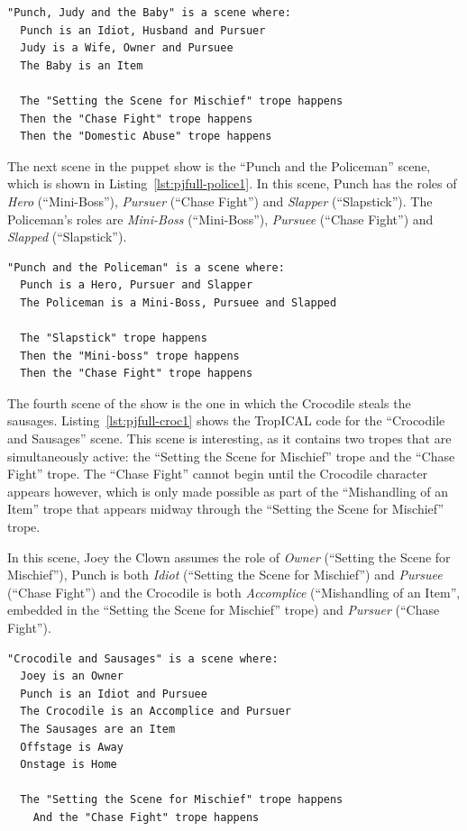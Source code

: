 \documentclass[11pt]{report}
\begin{document}
\begin{lstlisting}[showstringspaces=false,
label=lst:pjfull-baby1,caption={The ``Punch, Judy and the Baby'' scene in TropICAL}]
"Punch, Judy and the Baby" is a scene where:
  Punch is an Idiot, Husband and Pursuer
  Judy is a Wife, Owner and Pursuee
  The Baby is an Item

  The "Setting the Scene for Mischief" trope happens
  Then the "Chase Fight" trope happens
  Then the "Domestic Abuse" trope happens
\end{lstlisting}

The next scene in the puppet show is the ``Punch and the Policeman'' scene,
which is shown in Listing~\ref{lst:pjfull-police1}. In this scene, Punch has the
roles of \emph{Hero} (``Mini-Boss''), \emph{Pursuer} (``Chase Fight'') and
\emph{Slapper} (``Slapstick''). The Policeman's roles are \emph{Mini-Boss}
(``Mini-Boss''), \emph{Pursuee} (``Chase Fight'') and \emph{Slapped} (``Slapstick'').

\begin{lstlisting}[showstringspaces=false,
label=lst:pjfull-police1,caption={The ``Punch and the Policeman'' scene in TropICAL}]
"Punch and the Policeman" is a scene where:
  Punch is a Hero, Pursuer and Slapper
  The Policeman is a Mini-Boss, Pursuee and Slapped

  The "Slapstick" trope happens
  Then the "Mini-boss" trope happens
  Then the "Chase Fight" trope happens
\end{lstlisting}

The fourth scene of the show is the one in which the Crocodile steals the
sausages. Listing~\ref{lst:pjfull-croc1} shows the TropICAL code for the
``Crocodile and Sausages'' scene. This scene is interesting, as it contains two
tropes that are simultaneously active: the ``Setting the Scene for Mischief''
trope and the ``Chase Fight'' trope. The ``Chase Fight'' cannot begin until the
Crocodile character appears however, which is only made possible as part of the
``Mishandling of an Item'' trope that appears midway through the ``Setting the
Scene for Mischief'' trope.

In this scene, Joey the Clown assumes the role of \emph{Owner} (``Setting the
Scene for Mischief''), Punch is both \emph{Idiot} (``Setting the Scene for
Mischief'') and \emph{Pursuee} (``Chase Fight'') and the Crocodile is both
\emph{Accomplice} (``Mishandling of an Item'', embedded in the ``Setting the
Scene for Mischief'' trope) and \emph{Pursuer} (``Chase Fight'').

\begin{lstlisting}[showstringspaces=false,
label=lst:pjfull-croc1,caption={The ``Crocodile and Sausages'' scene in TropICAL}]
"Crocodile and Sausages" is a scene where:
  Joey is an Owner
  Punch is an Idiot and Pursuee
  The Crocodile is an Accomplice and Pursuer
  The Sausages are an Item
  Offstage is Away
  Onstage is Home

  The "Setting the Scene for Mischief" trope happens
    And the "Chase Fight" trope happens
\end{lstlisting}
\end{document}
